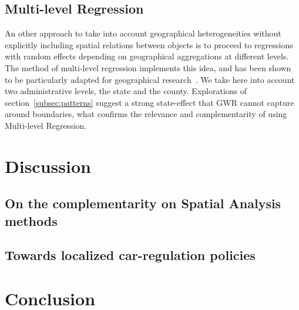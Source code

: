 \documentclass[3p,times,procedia]{elsarticle}
\begin{document}
\subsection{Multi-level Regression}

An other approach to take into account geographical heterogeneities without explicitly including spatial relations between objects is to proceed to regressions with random effects depending on geographical aggregations at different levels. The method of multi-level regression implements this idea, and has been shown to be particularly adapted for geographical research~\cite{jones1991specifying}. We take here into account two administrative levels, the state and the county. Explorations of section~\ref{subsec:patterns} suggest a strong state-effect that GWR cannot capture around boundaries, what confirms the relevance and complementarity of using Multi-level Regression.






\section{Discussion}

\subsection{On the complementarity on Spatial Analysis methods}



\subsection{Towards localized car-regulation policies}



\section{Conclusion}
\end{document}
